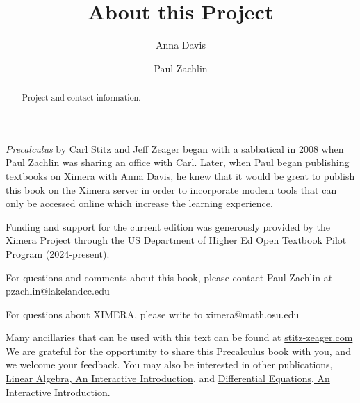 \documentclass{ximera}
\author{Anna Davis \and Paul Zachlin}
\title{About this Project} \license{CC-BY 4.0}
\begin{document}
\begin{abstract}
 Project and contact information.
\end{abstract}
\maketitle

\emph{Precalculus} by Carl Stitz and Jeff Zeager began with a sabbatical in 2008 when Paul Zachlin was sharing an office with Carl.  Later, when Paul began publishing textbooks on Ximera with Anna Davis, he knew that it would be great to publish this book on the Ximera server in order to incorporate modern tools that can only be accessed online which increase the learning experience.

Funding and support for the current edition was generously provided by the \href{https://github.com/XimeraProject}{Ximera Project} through the US Department of Higher Ed Open Textbook Pilot Program (2024-present).

For questions and comments about this book, please contact Paul Zachlin at pzachlin@lakelandcc.edu

For questions about XIMERA, please write to ximera@math.osu.edu

Many ancillaries that can be used with this text can be found at \href{https://www.stitz-zeager.com/ancillaries.html}{stitz-zeager.com}  
We are grateful for the opportunity to share this Precalculus book with you, and we welcome your feedback.  You may also be interested in other publications, \href{https://sites.google.com/view/lin-alg-interactive-intro/}{Linear Algebra, An Interactive Introduction}, and \href{https://sites.google.com/view/diffeq-interactive-intro}{Differential Equations, An Interactive Introduction}.
\end{document}
